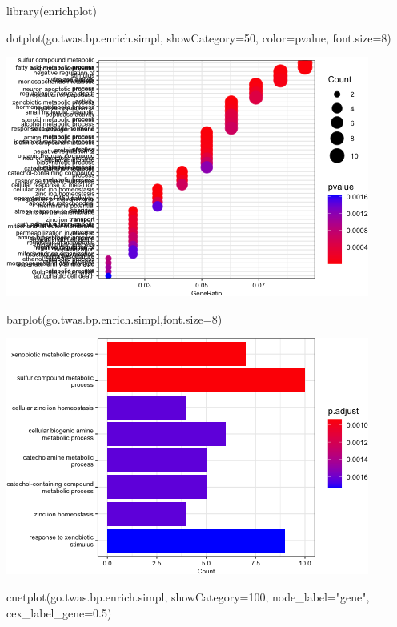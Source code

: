 \documentclass[
]{article}
\newenvironment{Shaded}{\begin{snugshade}}{\end{snugshade}}
\newcommand{\AttributeTok}[1]{\textcolor[rgb]{0.77,0.63,0.00}{#1}}
\newcommand{\DecValTok}[1]{\textcolor[rgb]{0.00,0.00,0.81}{#1}}
\newcommand{\FloatTok}[1]{\textcolor[rgb]{0.00,0.00,0.81}{#1}}
\newcommand{\FunctionTok}[1]{\textcolor[rgb]{0.00,0.00,0.00}{#1}}
\newcommand{\NormalTok}[1]{#1}
\newcommand{\StringTok}[1]{\textcolor[rgb]{0.31,0.60,0.02}{#1}}
\begin{document}
\begin{Shaded}
\begin{Highlighting}[]
\FunctionTok{library}\NormalTok{(enrichplot)}

\FunctionTok{dotplot}\NormalTok{(go.twas.bp.enrich.simpl, }
        \AttributeTok{showCategory=}\DecValTok{50}\NormalTok{,}
        \AttributeTok{color=}\StringTok{\textquotesingle{}pvalue\textquotesingle{}}\NormalTok{,}
        \AttributeTok{font.size=}\DecValTok{8}\NormalTok{)}
\end{Highlighting}
\end{Shaded}

\includegraphics{figures/twas-go-hfd-1.png}

\begin{Shaded}
\begin{Highlighting}[]
\FunctionTok{barplot}\NormalTok{(go.twas.bp.enrich.simpl,}\AttributeTok{font.size=}\DecValTok{8}\NormalTok{)}
\end{Highlighting}
\end{Shaded}

\includegraphics{figures/twas-go-hfd-2.png}

\begin{Shaded}
\begin{Highlighting}[]
\FunctionTok{cnetplot}\NormalTok{(go.twas.bp.enrich.simpl, }
         \AttributeTok{showCategory=}\DecValTok{100}\NormalTok{,}
         \AttributeTok{node\_label=}\StringTok{"gene"}\NormalTok{,}
         \AttributeTok{cex\_label\_gene=}\FloatTok{0.5}\NormalTok{)}
\end{Highlighting}
\end{Shaded}
\end{document}
